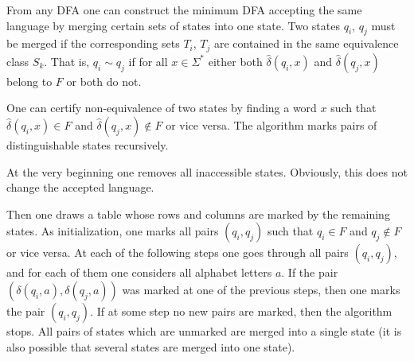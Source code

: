 

From any DFA one can construct the minimum DFA accepting the same language by merging certain sets of states into one state.
Two states $q_i$, $q_j$ must be merged if the corresponding sets $T_i$, $T_j$ are contained in the same equivalence class $S_k$.
That is, $q_i \sim q_j$ if for all $x \in \Sigma^*$ either both $\widehat{\delta}(q_i, x)$ and $\widehat{\delta}(q_j, x)$ belong to $F$ or both do not.

One can certify non-equivalence of two states by finding a word $x$ such that $\widehat{\delta}(q_i, x) \in F$ and $\widehat{\delta}(q_j, x) \notin F$
or vice versa.
The algorithm marks pairs of distinguishable states recursively.

At the very beginning one removes all inaccessible states.
Obviously, this does not change the accepted language.

Then one draws a table whose rows and columns are marked by the remaining states.
As initialization, one marks all pairs $(q_i,q_j)$ such that $q_i \in F$ and $q_j \notin F$ or vice versa.
At each of the following steps one goes through all pairs $(q_i,q_j)$, and for each of them one considers all alphabet letters $a$.
If the pair $(\delta(q_i,a), \delta(q_j,a))$ was marked at one of the previous steps, then one marks the pair $(q_i, q_j)$.
If at some step no new pairs are marked, then the algorithm stops.
All pairs of states which are unmarked are merged into a single state
(it is also possible that several states are merged into one state).
